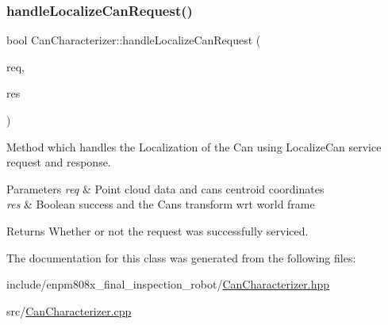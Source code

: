 \subsubsection{\texorpdfstring{handle\+Localize\+Can\+Request()}{handleLocalizeCanRequest()}}
{\footnotesize\ttfamily bool Can\+Characterizer\+::handle\+Localize\+Can\+Request (\begin{DoxyParamCaption}\item[{enpm808x\+\_\+final\+\_\+inspection\+\_\+robot\+::\+Localize\+Can\+::\+Localize\+Can\+::\+Request \&}]{req,  }\item[{enpm808x\+\_\+final\+\_\+inspection\+\_\+robot\+::\+Localize\+Can\+::\+Localize\+Can\+::\+Response \&}]{res }\end{DoxyParamCaption})}



Method which handles the Localization of the Can using Localize\+Can service request and response. 


\begin{DoxyParams}{Parameters}
{\em req} & Point cloud data and can\textquotesingle{}s centroid coordinates \\
\hline
{\em res} & Boolean success and the Can\textquotesingle{}s transform wrt world frame \\
\hline
\end{DoxyParams}
\begin{DoxyReturn}{Returns}
Whether or not the request was successfully serviced. 
\end{DoxyReturn}


The documentation for this class was generated from the following files\+:\begin{DoxyCompactItemize}
\item 
include/enpm808x\+\_\+final\+\_\+inspection\+\_\+robot/\hyperlink{CanCharacterizer_8hpp}{Can\+Characterizer.\+hpp}\item 
src/\hyperlink{CanCharacterizer_8cpp}{Can\+Characterizer.\+cpp}\end{DoxyCompactItemize}
